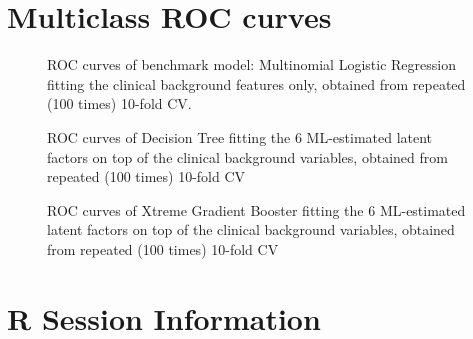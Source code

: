 \documentclass{amsart}
\begin{document}
\section{Multiclass ROC curves}
\begin{figure}[htb]
  
  \caption{ROC curves of benchmark model: Multinomial Logistic Regression fitting the clinical background features only, obtained from repeated (100 times) 10-fold CV.}
  \label{roc:bench}
\end{figure}
\begin{figure}[htb]

\caption{ROC curves of Decision Tree fitting the 6 ML-estimated latent factors on top of the clinical background variables, obtained from repeated (100 times) 10-fold CV}
\label{roc:tree}
\end{figure}
\begin{figure}

\caption{ROC curves of Xtreme Gradient Booster fitting the 6 ML-estimated latent factors on top of the clinical background variables, obtained from repeated (100 times) 10-fold CV}
\label{roc:xgb}
\end{figure}

\clearpage
\section{R Session Information} \label{appendixB}
\end{document}
